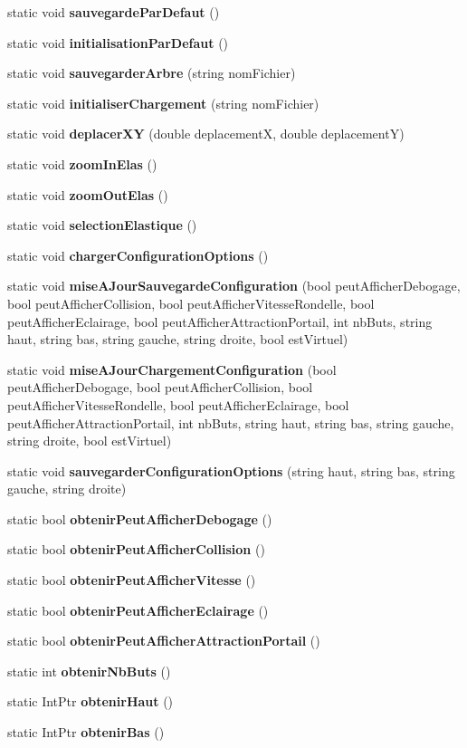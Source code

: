 \begin{DoxyCompactItemize}
static void {\bfseries sauvegarde\+Par\+Defaut} ()
\item 
static void {\bfseries initialisation\+Par\+Defaut} ()
\item 
static void {\bfseries sauvegarder\+Arbre} (string nom\+Fichier)
\item 
static void {\bfseries initialiser\+Chargement} (string nom\+Fichier)
\item 
static void {\bfseries deplacer\+XY} (double deplacementX, double deplacementY)
\item 
static void {\bfseries zoom\+In\+Elas} ()
\item 
static void {\bfseries zoom\+Out\+Elas} ()
\item 
static void {\bfseries selection\+Elastique} ()
\item 
static void {\bfseries charger\+Configuration\+Options} ()
\item 
static void {\bfseries mise\+A\+Jour\+Sauvegarde\+Configuration} (bool peut\+Afficher\+Debogage, bool peut\+Afficher\+Collision, bool peut\+Afficher\+Vitesse\+Rondelle, bool peut\+Afficher\+Eclairage, bool peut\+Afficher\+Attraction\+Portail, int nb\+Buts, string haut, string bas, string gauche, string droite, bool est\+Virtuel)
\item 
static void {\bfseries mise\+A\+Jour\+Chargement\+Configuration} (bool peut\+Afficher\+Debogage, bool peut\+Afficher\+Collision, bool peut\+Afficher\+Vitesse\+Rondelle, bool peut\+Afficher\+Eclairage, bool peut\+Afficher\+Attraction\+Portail, int nb\+Buts, string haut, string bas, string gauche, string droite, bool est\+Virtuel)
\item 
static void {\bfseries sauvegarder\+Configuration\+Options} (string haut, string bas, string gauche, string droite)
\item 
static bool {\bfseries obtenir\+Peut\+Afficher\+Debogage} ()
\item 
static bool {\bfseries obtenir\+Peut\+Afficher\+Collision} ()
\item 
static bool {\bfseries obtenir\+Peut\+Afficher\+Vitesse} ()
\item 
static bool {\bfseries obtenir\+Peut\+Afficher\+Eclairage} ()
\item 
static bool {\bfseries obtenir\+Peut\+Afficher\+Attraction\+Portail} ()
\item 
static int {\bfseries obtenir\+Nb\+Buts} ()
\item 
static Int\+Ptr {\bfseries obtenir\+Haut} ()
\item 
static Int\+Ptr {\bfseries obtenir\+Bas} ()

\end{DoxyCompactItemize}
